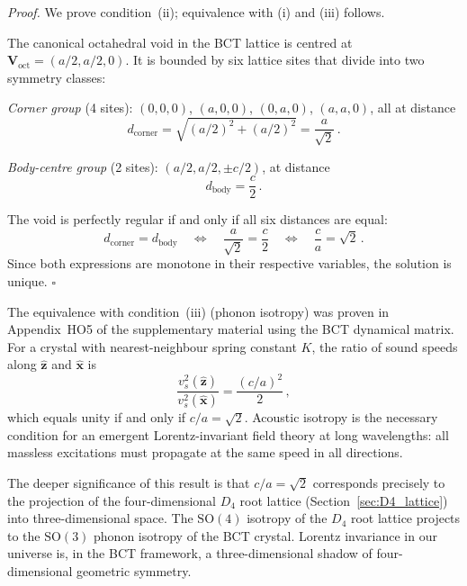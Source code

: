 \documentclass[review,number,sort&compress]{elsarticle}
\newcommand{\Dfour}{D_4}
\begin{document}
\medskip
\noindent\textit{Proof.}
We prove condition~(ii); equivalence with (i) and (iii) follows.

The canonical octahedral void in the BCT lattice is centred at
$\bm{V}_{\mathrm{oct}} = (a/2, a/2, 0)$. It is bounded by six lattice
sites that divide into two symmetry classes:

\textit{Corner group} (4 sites): $(0,0,0)$, $(a,0,0)$, $(0,a,0)$,
$(a,a,0)$, all at distance
\begin{equation}
  d_{\mathrm{corner}} = \sqrt{(a/2)^2 + (a/2)^2} = \frac{a}{\sqrt{2}}\,.
  \label{eq:d_corner}
\end{equation}

\textit{Body-centre group} (2 sites): $(a/2, a/2, \pm c/2)$, at distance
\begin{equation}
  d_{\mathrm{body}} = \frac{c}{2}\,.
  \label{eq:d_body}
\end{equation}

The void is perfectly regular if and only if all six distances are equal:
\begin{equation}
  d_{\mathrm{corner}} = d_{\mathrm{body}}
  \quad\Longleftrightarrow\quad
  \frac{a}{\sqrt{2}} = \frac{c}{2}
  \quad\Longleftrightarrow\quad
  \boxed{\frac{c}{a} = \sqrt{2}}\,.
  \label{eq:ca_uniqueness}
\end{equation}
Since both expressions are monotone in their respective variables, the
solution is unique. \hfill$\square$

\medskip
The equivalence with condition~(iii) (phonon isotropy) was proven in
Appendix~HO5 of the supplementary material using the BCT dynamical
matrix. For a crystal with nearest-neighbour spring constant $K$, the
ratio of sound speeds along $\hat{\bm{z}}$ and $\hat{\bm{x}}$ is
\begin{equation}
  \frac{v_s^2(\hat{\bm{z}})}{v_s^2(\hat{\bm{x}})}
  = \frac{(c/a)^2}{2}\,,
  \label{eq:isotropy}
\end{equation}
which equals unity if and only if $c/a = \sqrt{2}$. Acoustic isotropy
is the necessary condition for an emergent Lorentz-invariant field
theory at long wavelengths: all massless excitations must propagate at
the same speed in all directions.

The deeper significance of this result is that $c/a = \sqrt{2}$
corresponds precisely to the projection of the four-dimensional $\Dfour$
root lattice (Section~\ref{sec:D4_lattice}) into three-dimensional space.
The $\mathrm{SO}(4)$ isotropy of the $\Dfour$ root lattice projects to
the $\mathrm{SO}(3)$ phonon isotropy of the BCT crystal. Lorentz
invariance in our universe is, in the BCT framework, a three-dimensional
shadow of four-dimensional geometric symmetry.
\end{document}

